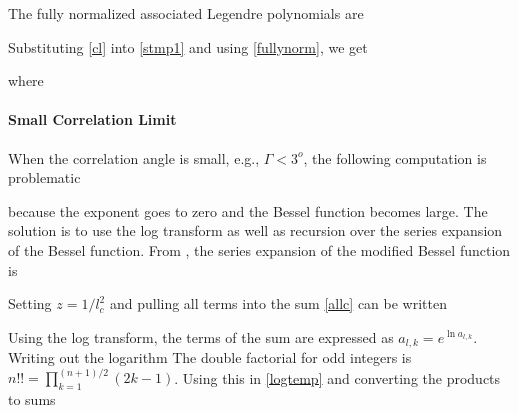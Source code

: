 
The fully normalized associated Legendre polynomials are 

Substituting \eqref{cl} into \eqref{stmp1} and using \eqref{fullynorm}, we get 


\noindent where 


\paragraph{Small Correlation Limit}
When the correlation angle is small, e.g., $\Gamma < 3^o$, the following computation is problematic

\noindent because the exponent goes to zero and the Bessel function becomes large.  The solution is to use the log transform as well as recursion over the series expansion of the Bessel function. From \cite[Eq.~10.53.3]{NIST:DLMF}, the series expansion of the modified Bessel function is 

Setting $z = 1/l_c^2$ and pulling all terms into the sum \eqref{allc} can be written  

Using the log transform, the terms of the sum are expressed as $a_{l,k} = e^{\ln a_{l,k}}$. Writing out the logarithm
The double factorial for odd integers is $n!! = \prod_{k=1}^{(n+1)/2} (2k - 1)$. Using this in \eqref{logtemp} and converting the products to sums



